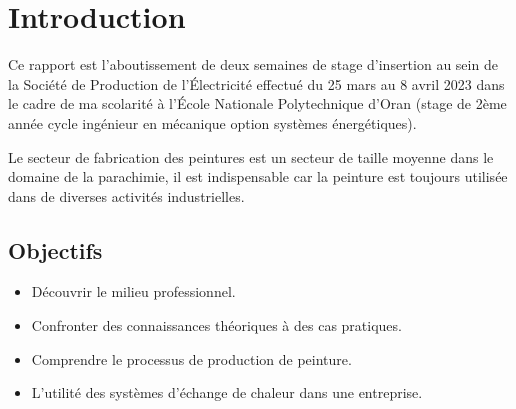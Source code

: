 \documentclass[20pt,a4paper]{report}
\begin{document}
	\newpage

	
	\tableofcontents
	
	\newpage	
	
	\listoffigures
	
	\newpage
	
	\chapter{Introduction}
	
	\newpage
	
	\begin{large}
	Ce rapport est l’aboutissement de deux semaines de stage d’insertion au sein de la Société de Production de l’Électricité effectué du 25 mars au 8 avril 2023 dans le cadre de ma scolarité à l’École Nationale Polytechnique d’Oran (stage de 2ème année cycle ingénieur en mécanique option systèmes énergétiques).

	Le secteur de fabrication des peintures est un secteur de taille moyenne dans le domaine de la parachimie, il est indispensable car la peinture est toujours utilisée dans de diverses activités industrielles.
	\end{large}
	
		\begin{large}
		\section{Objectifs}
		\begin{itemize}
			\item Découvrir le milieu professionnel.
			\item Confronter des connaissances théoriques à des cas pratiques.
			\item Comprendre le processus de production de peinture.
			\item L’utilité des systèmes d’échange de chaleur dans une entreprise.
		\end{itemize}
		\end{large}
		
\end{document}
